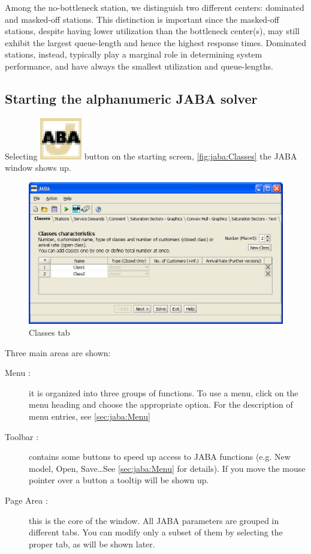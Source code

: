 Among the no-bottleneck station, we distinguish two different centers: dominated and masked-off stations.
This distinction is important since the masked-off stations, despite having lower utilization than the bottleneck center(s), may still exhibit the largest queue-length and hence the highest response times. Dominated stations, instead, typically play a marginal role in determining system performance, and have always the smallest utilization and queue-lengths. 


\subsection{Starting the alphanumeric JABA solver}
Selecting \includegraphics[scale=.5]{img/JABAIcon} button on the
starting screen, \autoref{fig:jaba:Classes} the JABA window shows up.
\begin{figure}[htbp]
    \begin{center}
        \includegraphics[scale=.5]{img/jaba/classes}
    \end{center}
    \caption{Classes tab}
    \label{fig:jaba:Classes}
\end{figure}

Three main areas are shown:
\begin{description}
\item[Menu :] it is organized into three groups of functions. To use a
menu, click on the menu heading and choose the appropriate option.
For the description of menu entries, see \autoref{sec:jaba:Menu}
\item[Toolbar :] contains some buttons to speed up access to JABA functions
(e.g. New model, Open, Save\dots See \autoref{sec:jaba:Menu} for
details). If you move the mouse pointer over a button a tooltip will
be shown up.
\item[Page Area :] this is the core of the window. All JABA parameters are grouped in
different tabs. You can modify only a subset of them by selecting
the proper tab, as will be shown later.
\end{description}

